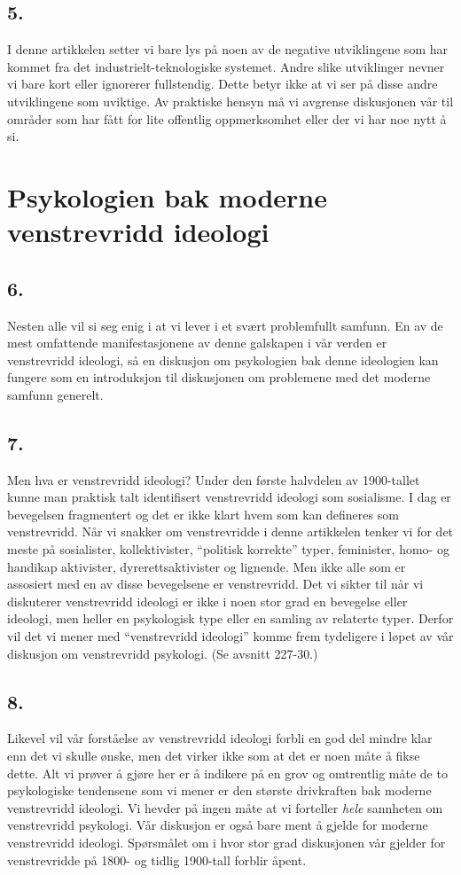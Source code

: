 \documentclass[oneside]{book}
\begin{document}
\section*{5.}
I denne artikkelen setter vi bare lys på noen av de negative utviklingene som
har kommet fra det industrielt-teknologiske systemet. Andre slike utviklinger
nevner vi bare kort eller ignorerer fullstendig. Dette betyr ikke at vi ser på
disse andre utviklingene som uviktige. Av praktiske hensyn må vi avgrense
diskusjonen vår til områder som har fått for lite offentlig oppmerksomhet eller
der vi har noe nytt å si.

\chapter{Psykologien bak moderne venstrevridd ideologi}
\section*{6.}
Nesten alle vil si seg enig i at vi lever i et svært problemfullt samfunn. En
av de mest omfattende manifestasjonene av denne galskapen i vår verden er
venstrevridd ideologi, så en diskusjon om psykologien bak denne ideologien kan
fungere som en introduksjon til diskusjonen om problemene med det moderne
samfunn generelt.

\section*{7.}
Men hva er venstrevridd ideologi? Under den første halvdelen av 1900-tallet
kunne man praktisk talt identifisert venstrevridd ideologi som sosialisme. I
dag er bevegelsen fragmentert og det er ikke klart hvem som kan defineres som
venstrevridd. Når vi snakker om venstrevridde i denne artikkelen tenker vi for
det meste på sosialister, kollektivister, ``politisk korrekte'' typer,
feminister, homo- og handikap aktivister, dyrerettsaktivister og lignende. Men
ikke alle som er assosiert med en av disse bevegelsene er venstrevridd. Det vi
sikter til når vi diskuterer venstrevridd ideologi er ikke i noen stor grad en
bevegelse eller ideologi, men heller en psykologisk type eller en samling av
relaterte typer. Derfor vil det vi mener med ``venstrevridd ideologi'' komme
frem tydeligere i løpet av vår diskusjon om venstrevridd psykologi. (Se avsnitt
227-30.)

\section*{8.}
Likevel vil vår forståelse av venstrevridd ideologi forbli en god del mindre
klar enn det vi skulle ønske, men det virker ikke som at det er noen måte å
fikse dette. Alt vi prøver å gjøre her er å indikere på en grov og omtrentlig
måte de to psykologiske tendensene som vi mener er den største drivkraften bak
moderne venstrevridd ideologi. Vi hevder på ingen måte at vi forteller {\em
hele} sannheten om venstrevridd psykologi. Vår diskusjon er også bare ment å
gjelde for moderne venstrevridd ideologi. Spørsmålet om i hvor stor grad
diskusjonen vår gjelder for venstrevridde på 1800- og tidlig 1900-tall forblir
åpent.
\end{document}
